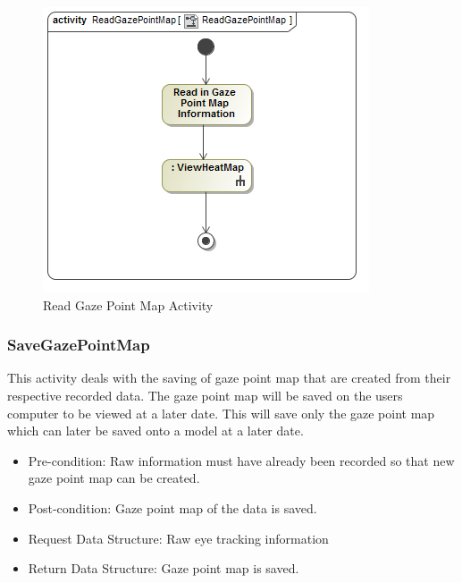 	\begin{figure}[!ht]
		\centering
		\includegraphics[scale=0.5]{Diagrams/Activity_Diagram__ReadGazePointMap__ReadGazePointMap.png}
		\caption{Read Gaze Point Map Activity}
	\end{figure}
	
	\subsubsection{SaveGazePointMap}
	This activity deals with the saving of gaze point map that are created from their respective recorded data. The gaze point map will be saved on the users computer to be viewed at a later date. This will save only the gaze point map which can later be saved onto a model at a later date.
	\begin{itemize}
		\item Pre-condition: Raw information must have already been recorded so that new gaze point map can be created.
		\item Post-condition: Gaze point map of the data is saved.
		\item Request Data Structure: Raw eye tracking information
		\item Return Data Structure: Gaze point map is saved.
	\end{itemize}
	
